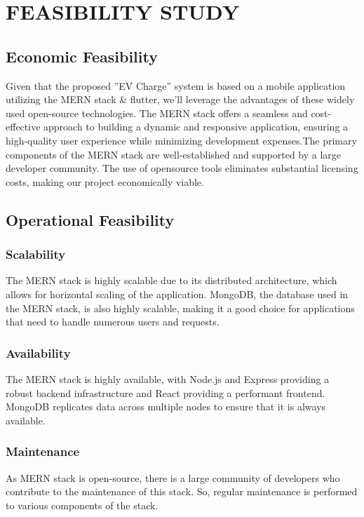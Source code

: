\newpage

\section{FEASIBILITY STUDY}


\subsection{Economic Feasibility}
Given that the proposed ”EV Charge” system is based on a mobile application utilizing the MERN stack & flutter, we’ll leverage the advantages of these widely used open-source technologies. The MERN stack offers a seamless and cost-effective approach to building a dynamic and responsive application, ensuring a high-quality user experience while minimizing development expenses.The primary components of the MERN stack are well-established and supported by a large developer community. The use of opensource tools eliminates substantial licensing costs, making our project economically viable.

\subsection{Operational Feasibility}
\subsubsection{Scalability}
The MERN stack is highly scalable due to its distributed architecture, which allows for horizontal scaling of the application. MongoDB, the database used in the MERN stack, is also highly scalable, making it a good choice for applications that need to handle numerous users and requests.

\subsubsection{Availability}
The MERN stack is highly available, with Node.js and Express providing a robust
backend infrastructure and React providing a performant frontend. MongoDB
replicates data across multiple nodes to ensure that it is always available.

\subsubsection{Maintenance}
As MERN stack is open-source, there is a large community of developers who
contribute to the maintenance of this stack. So, regular maintenance is performed to various components of the stack.


